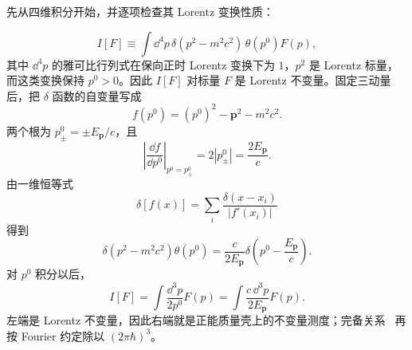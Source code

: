 \begin{derivation}
先从四维积分开始，并逐项检查其 Lorentz 变换性质：

\begin{equation*}
 I[F]\equiv
 \int\dd^4 p\,
 \delta(p^2-m^2c^2)\,\theta(p^0)F(p),
 \end{equation*}
其中 $\dd^4 p$ 的雅可比行列式在保向正时 Lorentz 变换下为 $1$，$p^2$ 是 Lorentz 标量，而这类变换保持 $p^0>0$。因此 $I[F]$ 对标量 $F$ 是 Lorentz 不变量。固定三动量后，把 $\delta$ 函数的自变量写成
\begin{equation*}
 f(p^0)=(p^0)^2-\mathbf p^2-m^2c^2.
\end{equation*}
两个根为 $p^0_\pm=\pm E_{\mathbf p}/c$，且
\begin{equation*}
 \left|\frac{\dd f}{\dd p^0}\right|_{p^0=p^0_\pm}
 =2\left|p^0_\pm\right|
 =\frac{2E_{\mathbf p}}{c}.
\end{equation*}
由一维恒等式
\begin{equation*}
 \delta[f(x)]
 =\sum_i\frac{\delta(x-x_i)}{|f'(x_i)|}
\end{equation*}
得到
\begin{equation*}
 \delta(p^2-m^2c^2)\theta(p^0)
 =\frac{c}{2E_{\mathbf p}}
 \delta\!\left(p^0-\frac{E_{\mathbf p}}{c}\right).
\end{equation*}
对 $p^0$ 积分以后，
\begin{equation*}
 I[F]
 =\int\frac{\dd^3 p}{2p^0}F(p)
 =\int\frac{c\,\dd^3 p}{2E_{\mathbf p}}F(p).
 \end{equation*}
左端是 Lorentz 不变量，因此右端就是正能质量壳上的不变量测度；完备关系~ 再按 Fourier 约定除以 $(2\pi\hbar)^3$。
\end{derivation}

